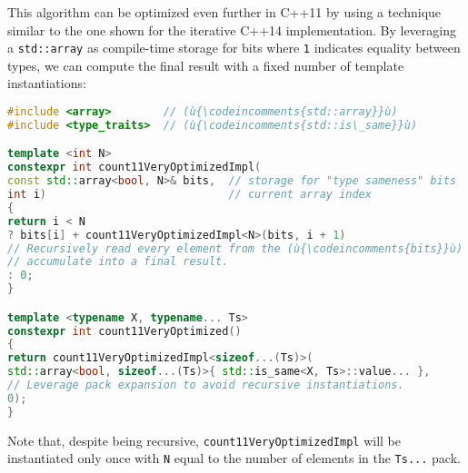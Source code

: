 \noindent This algorithm can be optimized even further in C++11 by using
a technique similar to the one shown for the iterative C++14
implementation. By leveraging a \texttt{std::array} as compile-time
storage for bits where \texttt{1} indicates equality between types, we can compute the final result with a fixed number of template
instantiations:

\begin{lstlisting}[language=C++]
#include <array>        // (ù{\codeincomments{std::array}}ù)
#include <type_traits>  // (ù{\codeincomments{std::is\_same}}ù)

template <int N>
constexpr int count11VeryOptimizedImpl(
const std::array<bool, N>& bits,  // storage for "type sameness" bits
int i)                            // current array index
{
return i < N
? bits[i] + count11VeryOptimizedImpl<N>(bits, i + 1)
// Recursively read every element from the (ù{\codeincomments{bits}}ù) array and
// accumulate into a final result.
: 0;
}

template <typename X, typename... Ts>
constexpr int count11VeryOptimized()
{
return count11VeryOptimizedImpl<sizeof...(Ts)>(
std::array<bool, sizeof...(Ts)>{ std::is_same<X, Ts>::value... },
// Leverage pack expansion to avoid recursive instantiations.
0);
}
\end{lstlisting}

\noindent Note that, despite being recursive, \texttt{count11VeryOptimizedImpl}
will be instantiated only once with \texttt{N} equal to the number of
elements in the \texttt{Ts...} pack.



